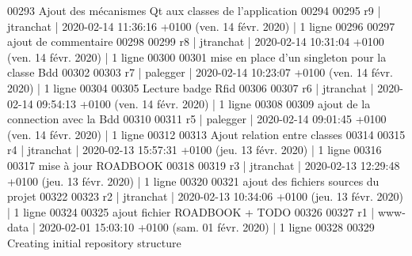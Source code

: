 \begin{DoxyCode}
00293 Ajout des mécanismes Qt aux classes de l'application
00294 
00295 r9 | jtranchat | 2020-02-14 11:36:16 +0100 (ven. 14 févr. 2020) | 1 ligne
00296 
00297 ajout de commentaire 
00298 
00299 r8 | jtranchat | 2020-02-14 10:31:04 +0100 (ven. 14 févr. 2020) | 1 ligne
00300 
00301 mise en place d'un singleton pour la classe Bdd
00302 
00303 r7 | palegger | 2020-02-14 10:23:07 +0100 (ven. 14 févr. 2020) | 1 ligne
00304 
00305 Lecture badge Rfid
00306 
00307 r6 | jtranchat | 2020-02-14 09:54:13 +0100 (ven. 14 févr. 2020) | 1 ligne
00308 
00309 ajout de la connection avec la Bdd
00310 
00311 r5 | palegger | 2020-02-14 09:01:45 +0100 (ven. 14 févr. 2020) | 1 ligne
00312 
00313 Ajout relation entre classes
00314 
00315 r4 | jtranchat | 2020-02-13 15:57:31 +0100 (jeu. 13 févr. 2020) | 1 ligne
00316 
00317 mise à jour ROADBOOK
00318 
00319 r3 | jtranchat | 2020-02-13 12:29:48 +0100 (jeu. 13 févr. 2020) | 1 ligne
00320 
00321 ajout des fichiers sources du projet
00322 
00323 r2 | jtranchat | 2020-02-13 10:34:06 +0100 (jeu. 13 févr. 2020) | 1 ligne
00324 
00325 ajout fichier ROADBOOK + TODO
00326 
00327 r1 | www-data | 2020-02-01 15:03:10 +0100 (sam. 01 févr. 2020) | 1 ligne
00328 
00329 Creating initial repository structure
\end{DoxyCode}
